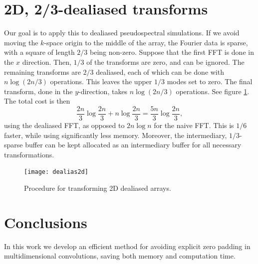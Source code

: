 \documentclass[final]{siamltex}
\def\be{\begin{dmath*}}
\def\ee{\end{dmath*}}
\begin{document}
\section{2D, 2/3-dealiased transforms}
Our goal is to apply this to dealiased pseudospectral simulations. If we 
avoid moving the $k$-space origin to the middle of the array, the Fourier
data is sparse, with a square of length $2/3$ being non-zero. Suppose that 
the first FFT is done in the $x$ direction.  Then, $1/3$ of the transforms
are zero, and can be ignored. The remaining transforms are $2/3$ dealiased,
each of which can be done with $n \log (2 n/3)$ operations. This leaves
the upper $1/3$ modes set to zero.  The final transform, done in the 
$y$-direction, takes $n \log(2 n/3)$ operations.  See figure \ref{dealias2d}.
The total cost is then
\be
\frac{2 n}{3} \log \frac{2 n}{3} +  n \log \frac{2 n}{3}
=\frac{5n}{3} \log \frac{2 n}{3},
\ee
using the dealiased FFT, as opposed to $2 n \log n$ for the naive FFT. This 
is $1/6$ faster, while using significantly less memory. Moreover, the
intermediary, $1/3$-sparse buffer can be kept allocated as an intermediary
buffer for all necessary transformations.
\begin{figure}[htbp]
  \begin{center}
    \texttt{[image: dealias2d]}
    \caption{Procedure for transforming 2D dealiased arrays.}
    \label{dealias2d}
  \end{center}
\end{figure}

\section{Conclusions}
In this work we develop an efficient method for avoiding explicit zero
padding in multidimensional convolutions, saving both memory and
computation time.
\end{document}
